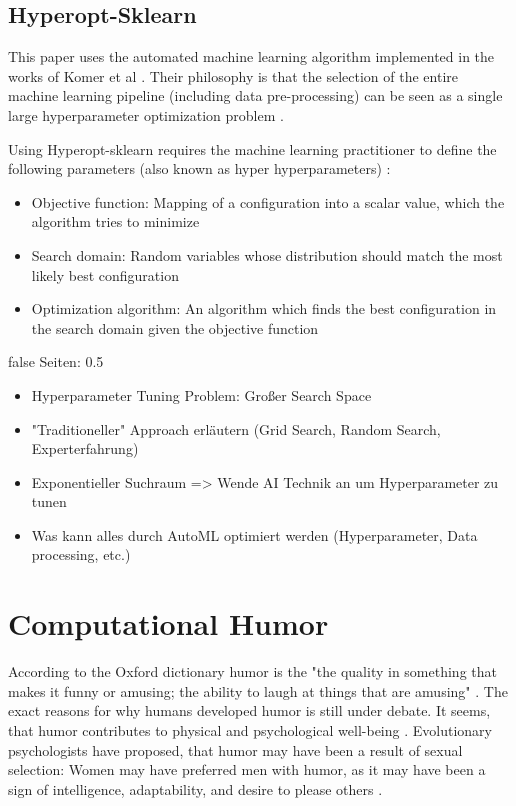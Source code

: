 \documentclass[draft,final,oneside]{vutinfth} %
\begin{document}
\subsection{Hyperopt-Sklearn}

This paper uses the automated machine learning algorithm implemented in the works of Komer et al \cite{hyperoptpaper}. Their philosophy is that the selection of the entire machine learning pipeline (including data pre-processing) can be seen as a single large hyperparameter optimization problem \cite{hyperoptpaper}.

Using Hyperopt-sklearn requires the machine learning practitioner to define the following parameters (also known as hyper hyperparameters) \cite{hyperoptpaper}:
\begin{itemize}
\item Objective function: Mapping of a configuration into a scalar value, which the algorithm tries to minimize \cite{hyperoptpaper}
\item Search domain: Random variables whose distribution should match the most likely best configuration \cite{hyperoptpaper}
\item Optimization algorithm: An algorithm which finds the best configuration in the search domain given the objective function \cite{hyperoptpaper}
\end{itemize}


\if false
Seiten: 0.5

\begin{itemize}
\item Hyperparameter Tuning Problem: Großer Search Space
\item "Traditioneller" Approach erläutern (Grid Search, Random Search, Experterfahrung)
\item Exponentieller Suchraum => Wende AI Technik an um Hyperparameter zu tunen
\item Was kann alles durch AutoML optimiert werden (Hyperparameter, Data processing, etc.)
\end{itemize}

\fi

\section{Computational Humor} \label{comphumorbackground}

According to the Oxford dictionary humor is the "the quality in something that makes it funny or amusing; the ability to laugh at things that are amusing" \cite{humordef}. The exact reasons for why humans developed humor is still under debate. It seems, that humor contributes to physical and psychological well-being \cite{humorhealthy}\cite{humorresearch}. Evolutionary psychologists have proposed, that humor may have been a result of sexual selection: Women may have preferred men with humor, as it may have been a sign of intelligence, adaptability, and desire to please others \cite{sep-humor}.	
\end{document}
